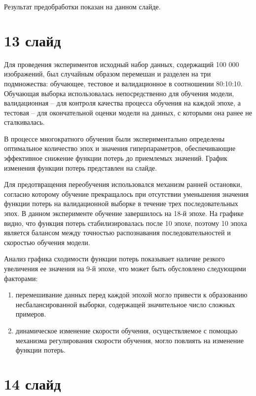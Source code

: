 \documentclass{altsu-report}
\begin{document}
Результат предобработки показан на данном слайде.

\section*{13 слайд}

Для проведения экспериментов исходный набор данных, содержащий 100 000 
изображений, был случайным образом перемешан и разделен на три подмножества: 
обучающее, тестовое и валидационное в соотношении 80:10:10. Обучающая выборка 
использовалась непосредственно для обучения модели, валидационная -- для контроля 
качества процесса обучения на каждой эпохе, а тестовая -- для окончательной 
оценки модели на данных, с которыми она ранее не сталкивалась.

В процессе многократного обучения были экспериментально определены оптимальное 
количество эпох и значения гиперпараметров, обеспечивающие эффективное снижение 
функции потерь до приемлемых значений. График изменения функции потерь 
представлен на слайде.

Для предотвращения переобучения использовался механизм ранней остановки, согласно 
которому обучение прекращалось при отсутствии уменьшения значения функции потерь 
на валидационной выборке в течение трех последовательных эпох. В данном 
эксперименте обучение завершилось на 18-й эпохе. На графике видно, что функция 
потерь стабилизировалась после 10 эпохе, поэтому 10 эпоха является балансом между 
точностью распознавания последовательностей и скоростью обучения модели.

Анализ графика сходимости функции потерь показывает наличие резкого увеличения ее 
значения на 9-й эпохе, что может быть обусловлено следующими факторами:

\begin{enumerate}
    \item перемешивание данных перед каждой эпохой могло привести к образованию 
    несбалансированной выборки, содержащей значительное число сложных примеров.
    \item динамическое изменение скорости обучения, осуществляемое с помощью 
    механизма регулирования скорости обучения, могло повлиять на изменение 
    функции потерь.
\end{enumerate}

\section*{14 слайд}
\end{document}
